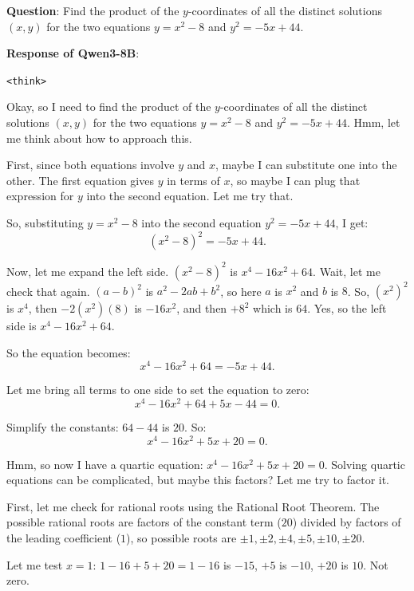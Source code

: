 \documentclass{article} %
\begin{document}
\begin{tcolorbox}[
  breakable,
  colback=gray!10,
  colframe=gray!60,
  title=Qwen3-8B often generates overly long responses,
  left=6pt,right=6pt,top=4pt,bottom=4pt,
  fontupper=\scriptsize
]
\textbf{Question}: Find the product of the $y$-coordinates of all the distinct solutions $(x,y)$ for the two equations $y=x^2-8$ and $y^2=-5x+44$.
\vspace{2pt}

\textbf{Response of Qwen3-8B}:

\texttt{<think>}

Okay, so I need to find the product of the $y$-coordinates of all the distinct solutions $(x, y)$ for the two equations $y = x^2 - 8$ and $y^2 = -5x + 44$. Hmm, let me think about how to approach this.

First, since both equations involve $y$ and $x$, maybe I can substitute one into the other. The first equation gives $y$ in terms of $x$, so maybe I can plug that expression for $y$ into the second equation. Let me try that.

So, substituting $y = x^2 - 8$ into the second equation $y^2 = -5x + 44$, I get:
\[(x^2 - 8)^2 = -5x + 44.\]

Now, let me expand the left side. $(x^2 - 8)^2$ is $x^4 - 16x^2 + 64$. Wait, let me check that again. $(a - b)^2$ is $a^2 - 2ab + b^2$, so here $a$ is $x^2$ and $b$ is $8$. So, $(x^2)^2$ is $x^4$, then $-2(x^2)(8)$ is $-16x^2$, and then $+8^2$ which is $64$. Yes, so the left side is $x^4 - 16x^2 + 64$.

So the equation becomes:
\[x^4 - 16x^2 + 64 = -5x + 44.\]

Let me bring all terms to one side to set the equation to zero:
\[x^4 - 16x^2 + 64 + 5x - 44 = 0.\]

Simplify the constants: $64 - 44$ is $20$. So:
\[x^4 - 16x^2 + 5x + 20 = 0.\]

Hmm, so now I have a quartic equation: $x^4 - 16x^2 + 5x + 20 = 0$. Solving quartic equations can be complicated, but maybe this factors? Let me try to factor it.

First, let me check for rational roots using the Rational Root Theorem. The possible rational roots are factors of the constant term ($20$) divided by factors of the leading coefficient ($1$), so possible roots are $\pm 1, \pm 2, \pm 4, \pm 5, \pm 10, \pm 20$.

Let me test $x = 1$: $1 - 16 + 5 + 20 = 1 - 16$ is $-15$, $+5$ is $-10$, $+20$ is $10$. Not zero.


\end{tcolorbox}
\end{document}
